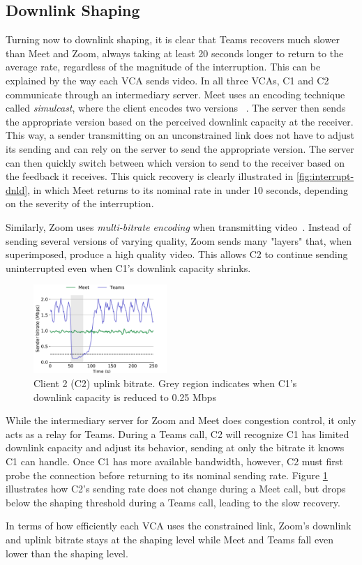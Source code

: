 \subsection{Downlink Shaping}
Turning now to downlink shaping, it is clear that Teams recovers much slower than Meet and Zoom, always taking at least 20 seconds longer to return to the average rate, regardless of the magnitude of the interruption. This can be explained by the way each VCA sends video. In all three VCAs, C1 and C2 communicate through an intermediary server. Meet uses an encoding technique called \textit{simulcast}, where the client encodes two versions ~\cite{nistico2020comparative}. The server then sends the appropriate version based on the perceived downlink capacity at the receiver. This way, a sender transmitting on an unconstrained link does not have to adjust its sending and can rely on the server to send the appropriate version. The server can then quickly switch between which version to send to the receiver based on the feedback it receives. This quick recovery is clearly illustrated in \ref{fig:interrupt-dnld}, in which Meet returns to its nominal rate in under 10 seconds, depending on the severity of the interruption.

Similarly, Zoom uses \textit{multi-bitrate encoding} when transmitting video~\cite{zoom_encoding}. Instead of sending several versions of varying quality, Zoom sends many "layers" that, when superimposed, produce a high quality video. This allows C2 to continue sending uninterrupted even when C1's downlink capacity shrinks. 

\begin{figure}[t]
    \centering
    \includegraphics[width=0.45\textwidth,keepaspectratio]{../figures/interrupt/Interrupt-sender.pdf}
    \caption{Client 2 (C2) uplink bitrate. Grey region indicates when C1's downlink capacity is reduced to 0.25 Mbps}
    \label{fig:interrupt-sender}
\end{figure}

While the intermediary server for Zoom and Meet does congestion control, it only acts as a relay for Teams. During a Teams call, C2 will recognize C1 has limited downlink capacity and adjust its behavior, sending at only the bitrate it knows C1 can handle. Once C1 has more available bandwidth, however, C2 must first probe the connection before returning to its nominal sending rate. Figure \ref{fig:interrupt-sender} illustrates how C2's sending rate does not change during a Meet call, but drops below the shaping threshold during a Teams call, leading to the slow recovery.

In terms of how efficiently each VCA uses the constrained link, Zoom's downlink and uplink bitrate stays at the shaping level while Meet and Teams fall even lower than the shaping level. 






